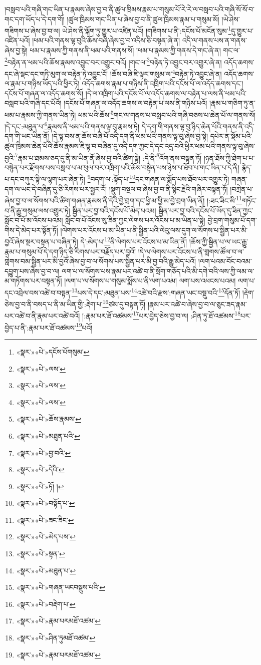 །བསླབ་པའི་གཞི་གང་ཡིན་པ་རྣམས་ཞེས་བྱ་བ་ནི་ཚུལ་ཁྲིམས་རྣམ་པ་གསུམ་པོ་རེ་རེ་ལ་བསླབ་པའི་གཞི་སོ་སོ་བ་གང་དག་ཡོད་པ་དེ་དག་གོ། །ཚུལ་ཁྲིམས་གང་ཡིན་པ་ཞེས་བྱ་བ་ནི་ཚུལ་ཁྲིམས་རྣམ་པ་གསུམ་མོ། །ཡེ་ཤེས་གཟིགས་པ་ཞེས་བྱ་བ་ལ། ཡེ་ཤེས་ནི་ལྐོག་ཏུ་གྱུར་པ་འཛིན་པའོ། །གཟིགས་པ་ནི་:དངོས་པོ་མངོན་སུམ་\footnote{«སྣར་»«པེ་»དངོས་པོགསུམ་}དུ་གྱུར་པ་འཛིན་པའོ། །ཕམ་པའི་གནས་ལྟ་བུའི་ཆོས་བཞི་ཞེས་བྱ་བ་འདིས་ཅི་བསྟན་ཞེ་ན། འདི་ལ་གནས་པས་ན་གནས་ཞེས་བྱ་སྟེ། ཕམ་པ་རྣམས་ཀྱི་གནས་ནི་ཕམ་པའི་གནས་སོ། །ཕམ་པ་རྣམས་ཀྱི་གནས་དེ་གང་ཞེ་ན། གང་ལ་\footnote{«སྣར་»«པེ་»ལས་}བརྟེན་ན་ཕམ་པའི་ཆོས་རྣམས་འབྱུང་བར་འགྱུར་བའོ། །གང་ལ་\footnote{«སྣར་»«པེ་»ལས་}བརྟེན་ཏེ་འབྱུང་བར་འགྱུར་ཞེ་ན། འདོད་ཆགས་དང་ཞེ་སྡང་དང་གཏི་མུག་ལ་བརྟེན་ཏེ་འབྱུང་ངོ། །ཆོས་བཞི་ཇི་ལྟར་གསུམ་ལ་\footnote{«སྣར་»«པེ་»ལས་}བརྟེན་ཏེ་འབྱུང་ཞེ་ན། འདོད་ཆགས་ལ་རྣམ་པ་གཉིས་ཡོད་པའི་ཕྱིར་ཏེ། འདོད་ཆགས་རྣམ་པ་གཉིས་ནི་འཁྲིག་པའི་དངོས་པོ་ལ་འདོད་ཆགས་དང་། དངོས་པོ་གཞན་ལ་འདོད་ཆགས་སོ། །དེ་ལ་འཁྲིག་པའི་དངོས་པོ་ལ་འདོད་ཆགས་ལ་བརྟེན་པ་ལས་ནི་ཕམ་པའི་བསླབ་པའི་གཞི་དང་པོའོ། །དངོས་པོ་གཞན་ལ་འདོད་ཆགས་ལ་བརྟེན་པ་ལས་ནི་གཉིས་པའོ། །རྣམ་པ་གཅིག་ཏུ་ན་ཕམ་པ་རྣམས་ཀྱི་གནས་ཡིན་ཏེ། ཕམ་པའི་ཆོས་\footnote{«སྣར་»«པེ་»ཆོས་རྣམས་}གང་ལ་གནས་པ་བསླབ་པའི་གཞི་བཅས་པ་ཆེན་པོ་ལ་གནས་སོ། །དེ་དང་:མཐུན་པ་\footnote{«སྣར་»«པེ་»མཐུན་པའི་}རྣམས་ནི་ཕམ་པའི་གནས་ལྟ་བུ་རྣམས་ཏེ། དེ་དག་གི་གནས་ལྟ་བུ་ཉིད་ཆེན་པོའི་གནས་ནི་འདི་དག་གི་ཡང་ཡིན་ནོ། །དེ་ལྟ་བས་ན་ཆོས་བཞི་པོ་འདི་དག་ནི་ཕམ་པའི་གནས་ལྟ་བུ་ཞེས་བྱ་སྟེ། དཔེར་ན་སྡོམ་པའི་ཚུལ་ཁྲིམས་ཆེན་པོའི་ཆོས་རྣམས་ཇི་ལྟ་བ་བཞིན་དུ་འདི་དག་ཀྱང་དེ་དང་འདྲ་བའི་ཕྱིར་ཕམ་པའི་གནས་ལྟ་བུ་ཞེས་བྱའི་\footnote{«སྣར་»«པེ་»བྱ་བའི་}རྣམ་པ་ཐམས་ཅད་དུ་ནི་མ་ཡིན་ནོ་ཞེས་བྱ་བའི་ཚིག་སྟེ། :དེ་ནི་\footnote{«སྣར་»«པེ་»དེའི་}འོག་ནས་བསྟན་ཏོ། །ཉན་ཐོས་ཀྱི་ཐེག་པ་པ་བསྙེན་པར་རྫོགས་པས་བསླབ་པ་མ་ཕུལ་བར་འཁྲིག་པའི་ཆོས་བསྟེན་པས་ཉེས་པ་ཐོབ་པ་གང་ཡིན་པ་དེ་ནི། རྙེད་པ་དང་བཀུར་སྟི་ལ་ལྷག་པར་ཞེན་ཏེ། \footnote{«སྣར་»«པེ་»ཏོ། ། }བདག་ལ་:སྟོད་པ་\footnote{«སྣར་»«པེ་»བསྟོད་པ་}དང་གཞན་ལ་སྨོད་པས་ཐོབ་པར་འགྱུར་ཏེ། གཞན་དག་ལ་ཡང་དེ་བཞིན་དུ་ཅི་རིགས་པར་སྦྱར་རོ། །སྡུག་བསྔལ་བ་ཞེས་བྱ་བ་ནི་སྙིང་རྗེའི་གཞིར་བསྟན་ཏོ། །བཀྲེན་པ་ཞེས་བྱ་བ་ལ་སོགས་པའི་ཚིག་གཞན་རྣམས་ནི་དེའི་བྱེ་བྲག་དང་ཕྱི་མ་ཕྱི་མ་བྱེ་བྲག་ཡིན་ནོ། །:ཟང་ཟིང་མི་\footnote{«སྣར་»«པེ་»ཟང་ཟིང་}གཏོང་བ་ནི་རྒྱུ་གསུམ་ལས་འགྱུར་ཏེ། སྦྱིན་པར་བྱ་བའི་དངོས་པོ་མེད་པའམ། སྦྱིན་པར་བྱ་བའི་དངོས་པོ་ཡོད་དུ་ཟིན་ཀྱང་སློང་བ་པོ་མ་འོངས་པའམ། སློང་བ་པོ་འོངས་སུ་ཟིན་ཀྱང་ལེགས་པར་འོངས་པ་མ་ཡིན་པ་སྟེ། བྱེ་བྲག་གསུམ་པོ་དག་གིས་དེ་མེད་པར་སྟོན་ཏོ། །ལེགས་པར་འོངས་པ་མ་ཡིན་པ་ནི་སྦྱིན་པའི་ལེའུ་ལས་དུག་ལ་སོགས་པ་སྦྱིན་པར་མི་བྱའོ་ཞེས་སྔར་བསྟན་པ་བཞིན་ཏེ། དེ་:མེད་པ་\footnote{«སྣར་»«པེ་»མེད་པས་}ནི་ལེགས་པར་འོངས་པ་མ་ཡིན་ནོ། །ཆོས་ཀྱི་སྦྱིན་པ་ལ་ཡང་རྒྱུ་རྣམ་པ་གསུམ་པོ་དེ་དག་ཉིད་ཅི་རིགས་པར་བརྗོད་པར་བྱའོ། །དེ་ལ་ལེགས་པར་འོངས་པ་ནི་གླགས་ཚོལ་བ་ལ་གླེགས་བམ་སྦྱིན་པར་མི་བྱའོ་ཞེས་བྱ་བ་ལ་སོགས་པས་སྦྱིན་པར་མི་བྱ་བའི་རྒྱུ་མེད་པའོ། །ལག་པའམ་བོང་བའམ་དབྱུག་པས་ཞེས་བྱ་བ་ལ། ལག་པ་ལ་སོགས་པས་རྣམ་པར་འཚེ་བ་ནི་སྲོག་གཅོད་པའི་མི་དགེ་བའི་ལས་ཀྱི་ལམ་ལ་མ་གཏོགས་པར་བསྟན་ཏོ། །ལག་པ་ལ་སོགས་པ་གསུམ་སྨོས་པ་ནི་ལག་པའམ། ལག་པས་འཕངས་པའམ། ལག་པ་དང་འབྲེལ་བས་འཚེ་བ་བསྟན་\footnote{«སྣར་»«པེ་»སྟན་}པས་དེ་དང་:མཐུན་པས་\footnote{«སྣར་»«པེ་»མཐུན་པ་}འཚེ་བའི་རྫས་:གཞན་ཡང་བསྡུ་བའི་\footnote{«སྣར་»«པེ་»གཞན་ཡངབསྡུས་པའི་}དོན་ཏོ། །རྡེག་ཅེས་བྱ་བ་ནི་བསད་པ་ནི་མ་ཡིན་གྱི་:རྡེག་པ་\footnote{«སྣར་»«པེ་»བརྡེག་པ་}ཙམ་དུ་བསྟན་ཏོ། །རྣམ་པར་འཚེ་བ་ཞེས་བྱ་བ་ལ་ཅུང་ཟད་རྣམ་པར་འཚེ་བ་ནི་རྣམ་པར་འཚེ་བའོ། །:རྣམ་པར་ཐོ་འཚམས་\footnote{«སྣར་»«པེ་»རྣམ་པརམཐོ་འཚམ་}པར་བྱེད་ཅེས་བྱ་བ་ལ། :ཤིན་ཏུ་ཐོ་འཚམས་\footnote{«སྣར་»«པེ་»ཤིན་ཏུམཐོ་འཚམ་}པར་བྱེད་པ་ནི་:རྣམ་པར་ཐོ་འཚམས་\footnote{«སྣར་»«པེ་»རྣམ་པརམཐོ་འཚམ་}པའོ། 